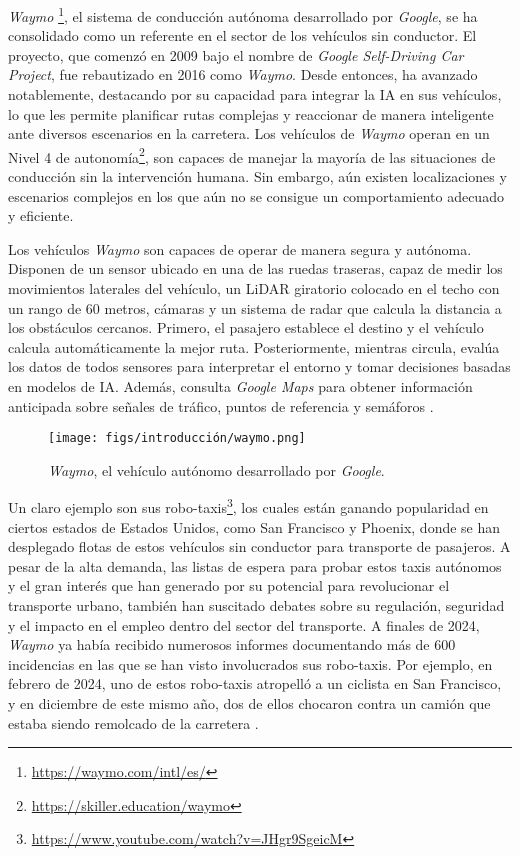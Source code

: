 \textit{Waymo} \footnote{\url{https://waymo.com/intl/es/}}, el sistema de conducción autónoma desarrollado por \textit{ Google}, se ha consolidado como un referente en el sector de los vehículos sin conductor. El proyecto, que comenzó en 2009 bajo el nombre de \textit{Google Self-Driving Car Project}, fue rebautizado en 2016 como \textit{Waymo}. Desde entonces, ha avanzado notablemente, destacando por su capacidad para integrar la \ac{IA} en sus vehículos, lo que les permite planificar rutas complejas y reaccionar de manera inteligente ante diversos escenarios en la carretera. Los vehículos de \textit{Waymo} operan en un Nivel 4 de autonomía\footnote{\url {https://skiller.education/waymo}}, son capaces de manejar la mayoría de las situaciones de conducción sin la intervención humana. Sin embargo, aún existen localizaciones y escenarios complejos en los que aún no se consigue un comportamiento adecuado y eficiente.

Los vehículos \textit{Waymo} son capaces de operar de manera segura y autónoma. Disponen de un sensor ubicado en una de las ruedas traseras, capaz de medir los movimientos laterales del vehículo, un \ac{LiDAR} giratorio colocado en el techo con un rango de 60 metros, cámaras y un sistema de radar que calcula la distancia a los obstáculos cercanos. Primero, el pasajero establece el destino y el vehículo calcula automáticamente la mejor ruta. Posteriormente, mientras circula, evalúa los datos de todos sensores para interpretar el entorno y tomar decisiones basadas en modelos de \ac{IA}. Además, consulta \textit{Google Maps} para obtener información anticipada sobre señales de tráfico, puntos de referencia y semáforos \cite{ai-self-driving-cars}.
\begin{figure}[ht]
\begin{center}
\texttt{[image: figs/introducción/waymo.png]}
\end{center}
\caption{\textit{Waymo}, el vehículo autónomo desarrollado por \textit{Google}.}
\label{fig:waymo}
\end{figure}

Un claro ejemplo son sus robo-taxis\footnote{\url{https://www.youtube.com/watch?v=JHgr9SgeicM}}, los cuales están ganando popularidad en ciertos estados de Estados Unidos, como San Francisco y Phoenix, donde se han desplegado flotas de estos vehículos sin conductor para transporte de pasajeros. A pesar de la alta demanda, las listas de espera para probar estos taxis autónomos y el gran interés que han generado por su potencial para revolucionar el transporte urbano, también han suscitado debates sobre su regulación, seguridad y el impacto en el empleo dentro del sector del transporte. A finales de 2024, \textit{Waymo} ya había recibido numerosos informes documentando más de 600 incidencias en las que se han visto involucrados sus robo-taxis. Por ejemplo, en febrero de 2024, uno de estos robo-taxis atropelló a un ciclista en San Francisco, y en diciembre de este mismo año, dos de ellos chocaron contra un camión que estaba siendo remolcado de la carretera \cite{waymo-wiki}. 

